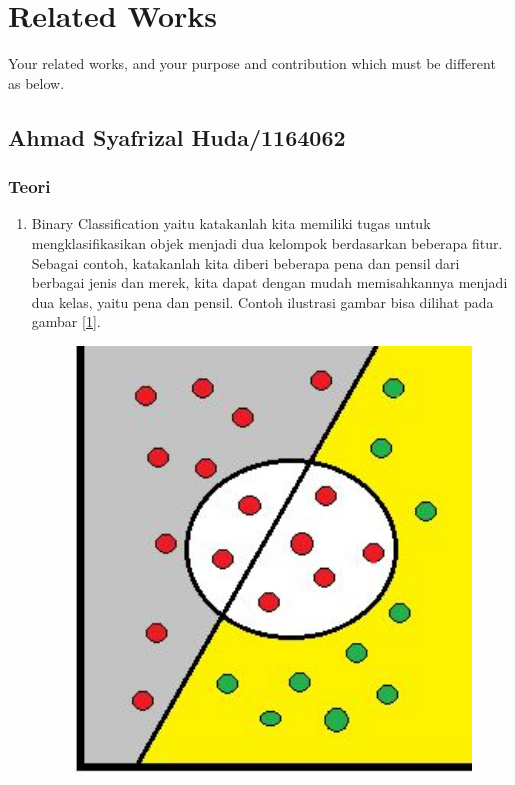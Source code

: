 \chapter{Related Works}

Your related works, and your purpose and contribution which must be different as below.

\section{Ahmad Syafrizal Huda/1164062}
\subsection{Teori}
\begin{enumerate}
\item Binary Classification yaitu katakanlah kita memiliki tugas untuk mengklasifikasikan objek menjadi dua kelompok berdasarkan beberapa fitur. Sebagai contoh, katakanlah kita diberi beberapa pena dan pensil dari berbagai jenis dan merek, kita dapat dengan mudah memisahkannya menjadi dua kelas, yaitu pena dan pensil.
\subitem Contoh ilustrasi gambar bisa dilihat pada gambar \ref{1}.
\begin{figure}[!htbp]
		\centerline{\includegraphics[width=1\textwidth]{figures/huda/binary.JPG}}

\end{figure}
\end{enumerate}
